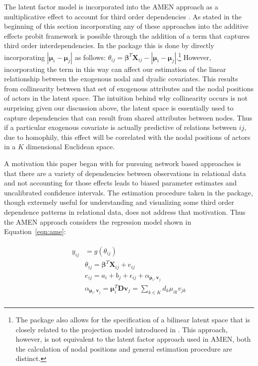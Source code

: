 The latent factor model is incorporated into the AMEN approach as a multiplicative effect to account for third order dependencies \citep{hoff:2009,hoff:etal:2015}. As stated in the beginning of this section incorporating any of these approaches into the additive effects probit framework is possible through the addition of a term that captures third order interdependencies. In the  package this is done by directly incorporating $|\bm\mu_{i} - \bm\mu_{j}|$ as follows: $\theta_{ij} = \bm\beta^{T} \mathbf{X}_{ij} - |\bm\mu_{i} - \bm\mu_{j}|$.\footnote{The  package also allows for the specification of a bilinear latent space that is closely related to the projection model introduced in \citet{hoff:etal:2002}. This approach, however, is not equivalent to the latent factor approach used in AMEN, both the calculation of nodal positions and general estimation procedure are distinct.} However, incorporating the term in this way can affect our estimation of the linear relationship between the exogenous nodal and dyadic covariates. This results from collinearity between that set of exogenous attributes and the nodal positions of actors in the latent space. The intuition behind why collinearity occurs is not surprising given our discussion above, the latent space is essentially used to capture dependencies that can result from shared attributes between nodes. Thus if a particular exogenous covariate is actually predictive of relations between $ij$, due to homophily, this effect will be correlated with the nodal positions of actors in a $K$ dimensional Euclidean space. 

A motivation this paper began with for pursuing network based approaches is that there are a variety of dependencies between observations in relational data and not accounting for those effects leads to biased parameter estimates and uncalibrated confidence intervals. The estimation procedure taken in the  package, though extremely useful for understanding and visualizing some third order dependence patterns in relational data, does not address that motivation. Thus the AMEN approach considers the regression model shown in Equation~\ref{eqn:ame}:

\begin{align}
\begin{aligned}
	y_{ij} &= g(\theta_{ij}) \\ 
	&\theta_{ij} = \bm\beta^{T} \mathbf{X}_{ij} + e_{ij} \\
	&e_{ij} = a_{i} + b_{j}  + \epsilon_{ij} + \alpha_{\bm\mu_{i}, \textbf{v}_{j}} \\
	&\alpha_{\bm\mu_{i}, \textbf{v}_{j}} = \bm\mu_{i}^{T} \textbf{D} \textbf{v}_{j} = \sum_{k \in K} d_{k} \mu_{ik} v_{jk} \\ 
\label{eqn:ame}
\end{aligned}
\end{align}

